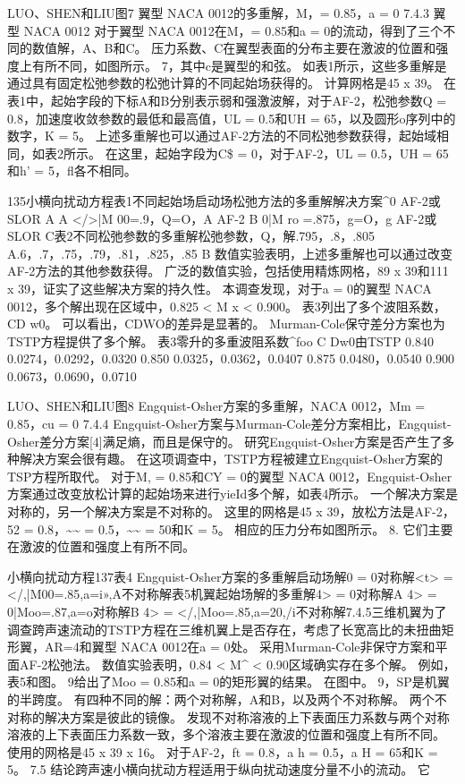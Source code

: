 \documentclass[UTF8,11pt,a4paper,openany,fontset=fandol]{ctexbook}
\begin{document}
LUO、SHEN和LIU图7 翼型 NACA 0012的多重解，M，= 0.85，a = 0 7.4.3 翼型 NACA 0012 对于翼型 NACA 0012在M，= 0.85和a = 0的流动，得到了三个不同的数值解，A、B和C。 压力系数、C在翼型表面的分布主要在激波的位置和强度上有所不同，如图所示。 7，其中c是翼型的和弦。 如表1所示，这些多重解是通过具有固定松弛参数的松弛计算的不同起始场获得的。 计算网格是45 x 39。 在表1中，起始字段的下标A和B分别表示弱和强激波解，对于AF-2，松弛参数Q = 0.8，加速度收敛参数的最低和最高值，UL = 0.5和UH = 65，以及圆形o序列中的数字，K = 5。 上述多重解也可以通过AF-2方法的不同松弛参数获得，起始域相同，如表2所示。 在这里，起始字段为C\$ = 0，对于AF-2，UL = 0.5，UH = 65和h' = 5，fl各不相同。

135小横向扰动方程表1不同起始场启动场松弛方法的多重解解决方案\textasciicircum{}0 AF-2或SLOR A A </>|M 00=.9，Q=O，A AF-2 B 0|M ro =.875，g=O，g AF-2或SLOR C表2不同松弛参数的多重解松弛参数，Q，解.795，.8，.805 A.6，.7，.75，.79，.81，.825，.85 B 数值实验表明，上述多重解也可以通过改变AF-2方法的其他参数获得。 广泛的数值实验，包括使用精炼网格，89 x 39和111 x 39，证实了这些解决方案的持久性。 本调查发现，对于a = 0的翼型 NACA 0012，多个解出现在区域中，0.825 < M x < 0.900。 表3列出了多个波阻系数，CD w0。 可以看出，CDWO的差异是显著的。 Murman-Cole保守差分方案也为TSTP方程提供了多个解。 表3零升的多重波阻系数\textasciicircum{}foo C Dw0由TSTP 0.840 0.0274，0.0292，0.0320 0.850 0.0325，0.0362，0.0407 0.875 0.0480，0.0540 0.900 0.0673，0.0690，0.0710

LUO、SHEN和LIU图8 Engquist-Osher方案的多重解，NACA 0012，Mm = 0.85，cu = 0 7.4.4 Engquist-Osher方案与Murman-Cole差分方案相比，Engquist-Osher差分方案[4]满足熵，而且是保守的。 研究Engquist-Osher方案是否产生了多种解决方案会很有趣。 在这项调查中，TSTP方程被建立Engquist-Osher方案的TSP方程所取代。 对于M, = 0.85和CY = 0的翼型 NACA 0012，Engquist-Osher方案通过改变放松计算的起始场来进行yieId多个解，如表4所示。 一个解决方案是对称的，另一个解决方案是不对称的。 这里的网格是45 x 39，放松方法是AF-2，52 = 0.8，\textasciitilde{}\textasciitilde{} = 0.5，\textasciitilde{}\textasciitilde{} = 50和K = 5。 相应的压力分布如图所示。 8. 它们主要在激波的位置和强度上有所不同。

小横向扰动方程137表4 Engquist-Osher方案的多重解启动场解0 = 0对称解<t> = </,|M00=.85,a=i»,A不对称解表5机翼起始场解的多重解4> = 0对称解A 4> = 0|Moo=.87,a=o对称解B 4> = </,|Moo=.85,a=20,/i不对称解7.4.5三维机翼为了调查跨声速流动的TSTP方程在三维机翼上是否存在，考虑了长宽高比的未扭曲矩形翼，AR=4和翼型 NACA 0012在a = 0处。 采用Murman-Cole非保守方案和平面AF-2松弛法。 数值实验表明，0.84 < M\textasciicircum{} < 0.90区域确实存在多个解。 例如，表5和图。 9给出了Moo = 0.85和a = 0的矩形翼的结果。 在图中。 9，SP是机翼的半跨度。 有四种不同的解：两个对称解，A和B，以及两个不对称解。 两个不对称的解决方案是彼此的镜像。 发现不对称溶液的上下表面压力系数与两个对称溶液的上下表面压力系数一致，多个溶液主要在激波的位置和强度上有所不同。 使用的网格是45 x 39 x 16。 对于AF-2，ft = 0.8，a h = 0.5，a H = 65和K = 5。 7.5 结论跨声速小横向扰动方程适用于纵向扰动速度分量不小的流动。 它
\end{document}
